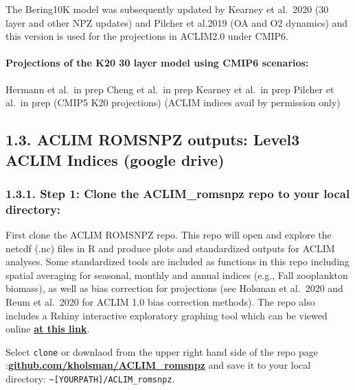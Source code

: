 \documentclass[
]{article}
\begin{document}
The Bering10K model was subsequently updated by Kearney et al.~2020 (30
layer and other NPZ updates) and Pilcher et al.2019 (OA and O2 dynamics)
and this version is used for the projections in ACLIM2.0 under CMIP6.

\hypertarget{projections-of-the-k20-30-layer-model-using-cmip6-scenarios}{%
\paragraph{Projections of the K20 30 layer model using CMIP6
scenarios:}\label{projections-of-the-k20-30-layer-model-using-cmip6-scenarios}}

Hermann et al.~in prep Cheng et al.~in prep Kearney et al.~in prep
Pilcher et al.~in prep (CMIP5 K20 projections) (ACLIM indices avail by
permission only)

\hypertarget{aclim-romsnpz-outputs-level3-aclim-indices-google-drive}{%
\subsection{1.3. ACLIM ROMSNPZ outputs: Level3 ACLIM Indices (google
drive)}\label{aclim-romsnpz-outputs-level3-aclim-indices-google-drive}}

\hypertarget{step-1-clone-the-aclim_romsnpz-repo-to-your-local-directory}{%
\subsubsection{1.3.1. Step 1: Clone the ACLIM\_romsnpz repo to your
local
directory:}\label{step-1-clone-the-aclim_romsnpz-repo-to-your-local-directory}}

First clone the ACLIM ROMSNPZ repo. This repo will open and explore the
netcdf (.nc) files in R and produce plots and standardized outputs for
ACLIM analyses. Some standardized tools are included as functions in
this repo including spatial averaging for seasonal, monthly and annual
indices (e.g., Fall zooplankton biomass), as well as bias correction for
projections (see Holsman et al.~2020 and Reum et al.~2020 for ACLIM 1.0
bias correction methods). The repo also includes a Rshiny interactive
exploratory graphing tool which can be viewed online \href{}{\textbf{at
this link}}.

Select \texttt{clone} or downlaod from the upper right hand side of the
repo page
:\href{https://github.com/kholsman/ACLIM_romsnpz}{\textbf{github.com/kholsman/ACLIM\_romsnpz}}
and save it to your local directory:
\texttt{\textasciitilde{}{[}YOURPATH{]}/ACLIM\_romsnpz}.
\end{document}
